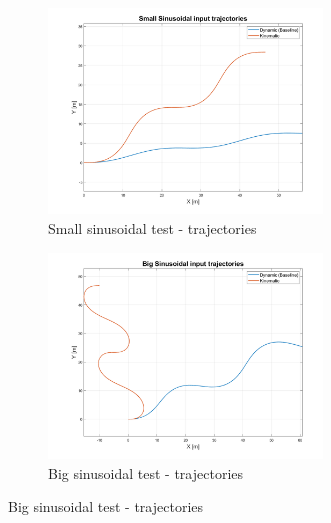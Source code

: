 \begin{figure}[H]
    \begin{subfigure}{.5\textwidth}
    \centering
   \includegraphics[width=0.8\textwidth,keepaspectratio]{Figures/Small_sin_traj.png}
   \caption{Small sinusoidal test - trajectories}
   \label{subfig:small_sinusoidal}
    \end{subfigure}%
    \begin{subfigure}{.5\textwidth}
    \centering
    \includegraphics[width=0.8\textwidth,keepaspectratio]{Figures/Big_sin_traj.png}
    \caption{Big sinusoidal test - trajectories}
    \label{subfig:big_sinusoidal}
    \end{subfigure}
    
     \vspace{10mm}
    

\end{figure}
